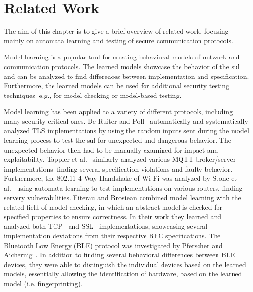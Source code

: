 %
%
% 
% 
% 

\chapter{Related Work}

\label{chap:Related}
The aim of this chapter is to give a brief overview of related work, focusing mainly on automata learning and testing of secure communication protocols.

Model learning is a popular tool for creating behavioral models of network and communication protocols. The learned models showcase the behavior of the \ac{sul} and can be analyzed to find differences between implementation and specification. Furthermore, the learned models can be used for additional security testing techniques, e.g., for model checking or model-based testing. 

Model learning has been applied to a variety of different protocols, including many security-critical ones. De Ruiter and Poll~\cite{DBLP:conf/uss/RuiterP15} automatically and systematically analyzed TLS implementations by using the random inputs sent during the model learning process to test the \ac{sul} for unexpected and dangerous behavior. The unexpected behavior then had to be manually examined for impact and exploitability. Tappler et al.~\cite{DBLP:conf/icst/TapplerAB17} similarly analyzed various MQTT broker/server implementations, finding several specification violations and faulty behavior. Furthermore, the 802.11 4-Way Handshake of Wi-Fi was analyzed by Stone et al.~\cite{DBLP:conf/esorics/StoneCR18} using automata learning to test implementations on various routers, finding servery vulnerabilities.
Fiterau and Brostean combined model learning with the related field of model checking, in which an abstract model is checked for specified properties to ensure correctness. In their work they learned and analyzed both TCP~\cite{DBLP:conf/cav/Fiterau-Brostean16} and SSL~\cite{DBLP:conf/spin/Fiterau-Brostean17} implementations, showcasing several implementation deviations from their respective RFC specifications.
The Bluetooth Low Energy (BLE) protocol was investigated by Pferscher and Aichernig~\cite{pferscher2021fingerprinting}. In addition to finding several behavioral differences between BLE devices, they were able to distinguish the individual devices based on the learned models, essentially allowing the identification of hardware, based on the learned model (i.e. fingerprinting).

